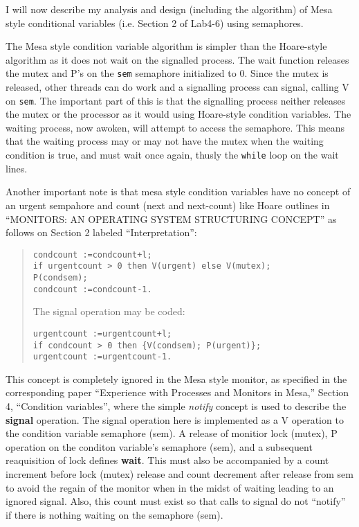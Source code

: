 \documentclass[11pt]{article}
\begin{document}
\begin{question}

    I will now describe my analysis and design (including the algorithm) of Mesa style conditional variables (i.e. Section 2 of Lab4-6) using semaphores.

    The Mesa style condition variable algorithm is simpler than the Hoare-style algorithm as it does not wait on the signalled process. The wait function releases the mutex and P's on the {\tt sem} semaphore initialized to 0. Since the mutex is released, other threads can do work and a signalling process can signal, calling V on {\tt sem}. The important part of this is that the signalling process neither releases the mutex or the processor as it would using Hoare-style condition variables. The waiting process, now awoken, will attempt to access the semaphore. This means that the waiting process may or may not have the mutex when the waiting condition is true, and must wait once again, thusly the {\tt while} loop on the wait lines.

    Another important note is that mesa style condition variables have no concept of an urgent sempahore and count (next and next-count) like Hoare outlines in ``MONITORS: AN OPERATING SYSTEM STRUCTURING CONCEPT'' as follows on Section 2 labeled ``Interpretation'':

    \begin{quote}
        \begin{verbatim}
condcount :=condcount+l;
if urgentcount > 0 then V(urgent) else V(mutex);
P(condsem);
condcount :=condcount-1.
        \end{verbatim}
    The signal operation may be coded:
        \begin{verbatim}
urgentcount :=urgentcount+l;
if condcount > 0 then {V(condsem); P(urgent)};
urgentcount :=urgentcount-1.
        \end{verbatim}
    \end{quote}

    This concept is completely ignored in the Mesa style monitor, as specified in the corresponding paper ``Experience with Processes and Monitors in Mesa,'' Section 4, ``Condition variables'', where the simple {\it notify} concept is used to describe the {\bf signal} operation. The signal operation here is implemented as a V operation to the condition variable semaphore (sem). A release of monitior lock (mutex), P operation on the conditon variable's semaphore (sem), and a subsequent reaquisition of lock defines {\bf wait}. This must also be accompanied by a count increment before lock (mutex) release and count decrement after release from sem to avoid the regain of the monitor when in the midst of waiting leading to an ignored signal. Also, this count must exist so that calls to signal do not ``notify'' if there is nothing waiting on the semaphore (sem).

\end{question}
\end{document}
